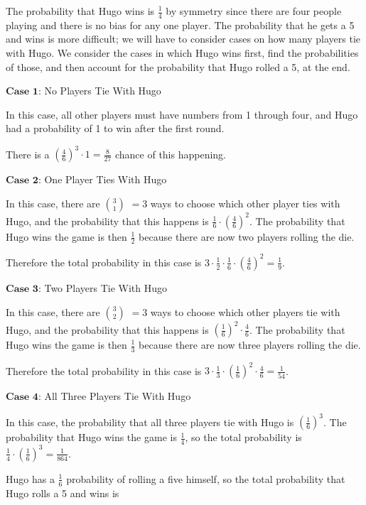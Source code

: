 \begin{enumerate}
 The probability that Hugo wins is $\frac{1}{4}$ by symmetry since there are four people playing and there is no bias for any one player. The probability that he gets a 5 and wins is more difficult; we will have to consider cases on how many players tie with Hugo. We consider the cases in which Hugo wins first, find the probabilities of those, and then account for the probability that Hugo rolled a 5, at the end.

 
$\textbf{Case 1:}$ No Players Tie With Hugo

 In this case, all other players must have numbers from 1 through four, and Hugo had a probability of 1 to win after the first round.

 There is a $\left(\frac{4}{6}\right)^{3} \cdot 1 = \frac{8}{27}$ chance of this happening.

 
$\textbf{Case 2:}$ One Player Ties With Hugo

 In this case, there are $3 \choose 1$ $= 3$ ways to choose which other player ties with Hugo, and the probability that this happens is $\frac{1}{6} \cdot \left(\frac{4}{6}\right)^2$. The probability that Hugo wins the game is then $\frac{1}{2}$ because there are now two players rolling the die. 

 Therefore the total probability in this case is $3 \cdot \frac{1}{2} \cdot \frac{1}{6} \cdot \left(\frac{4}{6}\right)^2= \frac{1}{9}$.

 $\textbf{Case 3:}$ Two Players Tie With Hugo

 In this case, there are $3 \choose 2$ $= 3$ ways to choose which other players tie with Hugo, and the probability that this happens is $\left(\frac{1}{6}\right)^2 \cdot \frac{4}{6}$. The probability that Hugo wins the game is then $\frac{1}{3}$ because there are now three players rolling the die. 

 Therefore the total probability in this case is $3 \cdot \frac{1}{3} \cdot \left(\frac{1}{6}\right)^2 \cdot \frac{4}{6} = \frac{1}{54}$.

 $\textbf{Case 4:}$ All Three Players Tie With Hugo

 In this case, the probability that all three players tie with Hugo is $\left(\frac{1}{6}\right)^3$. The probability that Hugo wins the game is $\frac{1}{4}$, so the total probability is $\frac{1}{4} \cdot \left(\frac{1}{6}\right)^3 = \frac{1}{864}$.

 Hugo has a $\frac{1}{6}$ probability of rolling a five himself, so the total probability that Hugo rolls a 5 and wins is


\end{enumerate}
